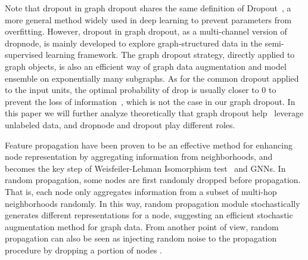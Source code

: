 {{Note that dropout in graph dropout shares the same definition of Dropout~\cite{srivastava2014dropout}, a more general method widely used in deep learning to prevent parameters from overfitting. However, dropout in graph dropout, as a multi-channel version of dropnode, is mainly developed to explore graph-structured data in the semi-supervised learning framework. The graph dropout strategy, directly applied to graph objects, is also an efficient way of graph data augmentation and  model ensemble on exponentially many subgraphs. As for the common dropout applied to the input units, the optimal probability of drop is usually closer to 0 to prevent the loss of information~\cite{srivastava2014dropout}, which is not the case in our graph dropout. In this paper we will further analyze theoretically that graph dropout help \model\ leverage unlabeled data, and dropnode and dropout play different roles. 
}



Feature propagation have been proven to be an effective method for enhancing node representation by aggregating information from neighborhoods, and becomes the key step of Weisfeiler-Lehman Isomorphism test~\cite{shervashidze2011weisfeiler} and GNNs. In random propagation, some nodes are first randomly dropped before propagation. That is, each node only aggregates information from a subset of multi-hop neighborhoods randomly. In this way, random propagation module stochastically generates different representations for a node, suggesting an efficient stochastic augmentation method for graph data. From another point of view, random propagation can also be seen as injecting random noise to the propagation procedure by dropping a portion of nodes . 

}
